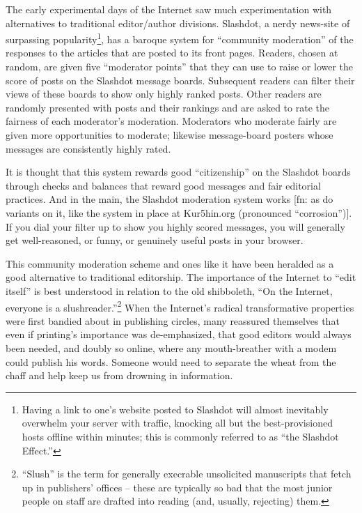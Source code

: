 The early experimental days of the Internet saw much
experimentation with alternatives to traditional editor/author
divisions. Slashdot, a nerdy news-site of surpassing popularity\footnote{
  Having a link to one's website posted to Slashdot will almost
  inevitably overwhelm your server with traffic, knocking all but the
  best-provisioned hosts offline within minutes; this is commonly
  referred to as ``the Slashdot Effect.''},
has a baroque system for
``community moderation'' of the responses to the articles that are
posted to its front pages. Readers, chosen at random, are given
five ``moderator points'' that they can use to raise or lower the
score of posts on the Slashdot message boards. Subsequent readers
can filter their views of these boards to show only highly ranked
posts. Other readers are randomly presented with posts and their
rankings and are asked to rate the fairness of each moderator's
moderation. Moderators who moderate fairly are given more
opportunities to moderate; likewise message-board posters whose
messages are consistently highly rated.

It is thought that this system rewards good ``citizenship'' on the
Slashdot boards through checks and balances that reward good
messages and fair editorial practices. And in the main, the
Slashdot moderation system works [fn: as do variants on it, like
the system in place at Kur5hin.org (pronounced ``corrosion'')]. If
you dial your filter up to show you highly scored messages, you
will generally get well-reasoned, or funny, or genuinely useful
posts in your browser.

This community moderation scheme and ones like it have been
heralded as a good alternative to traditional editorship. The
importance of the Internet to ``edit itself'' is best understood in
relation to the old shibboleth, ``On the Internet, everyone is a
slushreader.''\footnote{
  ``Slush'' is the term for generally execrable
  unsolicited manuscripts that fetch up in publishers' offices --
  these are typically so bad that the most junior people on staff are
  drafted into reading (and, usually, rejecting) them.}
When the
Internet's radical transformative properties were first bandied
about in publishing circles, many reassured themselves that even if
printing's importance was de-emphasized, that good editors would
always been needed, and doubly so online, where any mouth-breather
with a modem could publish his words. Someone would need to
separate the wheat from the chaff and help keep us from drowning in
information.

